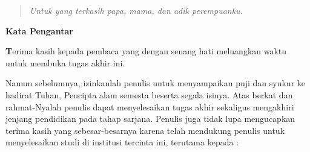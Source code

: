 \documentclass[12pt,a4paper]{report}
\def\abstractname{\LARGE \textbf{Abstract}}
\begin{document}
\newpage
\begin{verse}
\setcounter{page}{0}
\vspace*{2cm}
\begin{center}
\emph{\normalsize Untuk yang terkasih papa, mama, dan adik perempuanku.}
\end{center}
\end{verse}

\def\abstractname{\LARGE \textbf{Abstrak}}
\begin{abstract}
\setcounter{page}{5}

{\normalsize Pemodelan secara matematis pembangkitan gelombang arah
tunggal disampaikan dalam laporan tugas akhir ini. Pemodelannya
mencakup persamaan Laplace dalam kolam air dengan setengah batas
tak hingga, syarat batas dinamika dan kinematika, syarat batas
lateral di pembangkit gelombang, dan dinding tetap di dasar kolam.
Modelnya diterapkan pada \textit{wavemaker} tipe \textit{flap}
yang sering digunakan pada suatu \textit{towing tank} dalam
laboratorium hidrodinamika. Untuk menyederhanakan permasalahan,
beberapa asumsi diterapkan, yakni bahwa air adalah fluida yang
bersifat ideal. Teori pembangkit gelombang linear digunakan dan
tipe gelombang monokromatik (frekuensi tunggal) diamati. Kaitan
antara bilangan gelombang, ketinggian gelombang, dan simpangan
\textit{wavemaker} juga akan diturunkan. \par} \vspace*{1cm}

\noindent
{\normalsize \textbf{Kata-kata kunci:} fluida ideal, pembangkit
gelombang (\textit{wavemaker}), persamaan Laplace, syarat batas
kinematika permukaan bebas, syarat batas dinamika permukaan bebas,
teori pembangkit gelombang linear, gelombang monokromatik,
bilangan gelombang, ketinggian gelombang, dan simpangan pembangkit
gelombang.  \par}
\end{abstract}

\begin{center}
\huge {\textbf{Kata Pengantar}}
\end{center}
\setcounter{page}{6}

\normalsize {\Huge \textbf{T}}erima kasih kepada pembaca yang
dengan senang hati meluangkan waktu untuk membuka tugas akhir ini.%
 Namun sebelumnya,
izinkanlah penulis untuk menyampaikan puji dan syukur ke hadirat
Tuhan, Pencipta alam semesta beserta segala isinya. Atas
berkat dan rahmat-Nyalah penulis dapat menyelesaikan tugas akhir
sekaligus mengakhiri jenjang pendidikan pada tahap sarjana.
Penulis juga tidak lupa mengucapkan terima kasih yang
sebesar-besarnya karena telah mendukung penulis untuk
menyelesaikan studi di institusi tercinta ini, terutama kepada :
\end{document}
